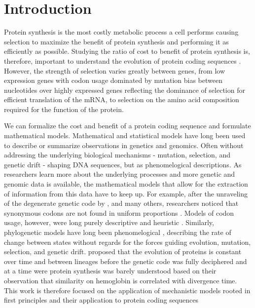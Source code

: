 \chapter{Introduction} 
\label{ch:introduction}

Protein synthesis is the most costly metabolic process a cell performs \citep{Reeds1985,WaterlowAndMillward1989,buttgereit1995,warner1999,AkashiAndGojobori2002,lindqvist2018} causing selection to maximize the benefit of protein synthesis and performing it as efficiently as possible.
Studying the ratio of cost to benefit of protein synthesis is, therefore, important to understand the evolution of protein coding sequences \citep{gilchrist2009,ShahAndGilchrist2011,gilchrist2015,beaulieu2019}.
However, the strength of selection varies greatly between genes, from low expression genes with codon usage dominated by mutation bias between nucleotides over highly expressed genes reflecting the dominance of selection for efficient translation of the mRNA, to selection on the amino acid composition required for the function of the protein.

We can formalize the cost and benefit of a protein coding sequence and formulate mathematical models.
Mathematical and statistical models have long been used to describe or summarize observations in genetics and genomics.
Often without addressing the underlying biological mechanisms - mutation, selection, and genetic drift - shaping DNA sequences, but as phenomelogical descriptions.
As researchers learn more about the underlying processes and more genetic and genomic data is available, the mathematical models that allow for the extraction of information from this data have to keep up.
For example, after the unraveling of the degenerate genetic code by \citet{MatthaeiAndNirenberg1961,NirenbergAndMatthaei1961,Maxwell1962,LederAndNirenberg1964}, and many others, researchers noticed that synonymous codons are not found in uniform proportions \citep{fitch1976,grantham1980,ikemura1981,grantham1981,sharp1988}.
Models of codon usage, however, were long purely descriptive and heuristic \citep{ikemura1981,BennetzenAndHall1982,sharp1987,Wright1990}.
Similarly, phylogenetic models have long been phenomelogical \citep{JukesAndCantor1969,Dayhoff1978,Kimura1980,felsenstein1981,Altschul1991}, describing the rate of change between states without regards for the forces guiding evolution, mutation, selection, and genetic drift.
\citet{ZuckerkandlAndPauling1962} proposed that the evolution of proteins is constant over time and between lineages before the genetic code was fully deciphered and at a time were protein synthesis was barely understood based on their observation that similarity on hemoglobin is correlated with divergence time.
This work is therefore focused on the application of mechanistic models rooted in first principles and their application to protein coding sequences

